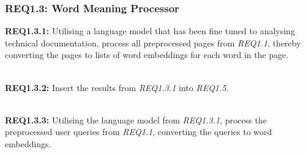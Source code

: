 \subsubsection{REQ1.3: Word Meaning Processor}

\textbf{REQ1.3.1:} Utilising a language model that has been fine tuned to analysing technical documentation, process all preprocessed pages from \textit{REQ1.1}, thereby converting the pages to lists of word embeddings for each word in the page.\par

\textbf{\\REQ1.3.2:} Insert the results from \textit{REQ1.3.1} into \textit{REQ1.5}.\par

\textbf{\\REQ1.3.3:} Utilising the language model from \textit{REQ1.3.1}, process the preprocessed user queries from \textit{REQ1.1}, converting the queries to word embeddings.\par
